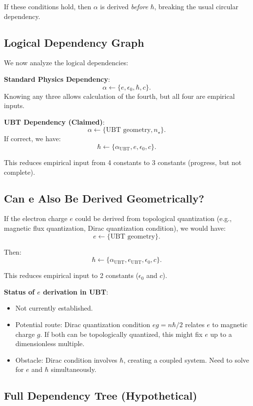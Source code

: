 \documentclass[12pt]{article}
\begin{document}
If these conditions hold, then $\alpha$ is derived \emph{before} $\hbar$, breaking the usual circular dependency.

\subsection{Logical Dependency Graph}

We now analyze the logical dependencies:

\textbf{Standard Physics Dependency}:
\[
\alpha \leftarrow \{e, \epsilon_0, \hbar, c\}.
\]
Knowing any three allows calculation of the fourth, but all four are empirical inputs.

\textbf{UBT Dependency (Claimed)}:
\[
\alpha \leftarrow \{\text{UBT geometry}, n_\star\}.
\]
If correct, we have:
\[
\hbar \leftarrow \{\alpha_{\text{UBT}}, e, \epsilon_0, c\}.
\]

This reduces empirical input from 4 constants to 3 constants (progress, but not complete).

\subsection{Can e Also Be Derived Geometrically?}

If the electron charge $e$ could be derived from topological quantization (e.g., magnetic flux quantization, Dirac quantization condition), we would have:
\[
e \leftarrow \{\text{UBT geometry}\}.
\]

Then:
\[
\hbar \leftarrow \{\alpha_{\text{UBT}}, e_{\text{UBT}}, \epsilon_0, c\}.
\]

This reduces empirical input to 2 constants ($\epsilon_0$ and $c$).

\textbf{Status of $e$ derivation in UBT}:
\begin{itemize}
\item Not currently established.
\item Potential route: Dirac quantization condition $eg = n \hbar / 2$ relates $e$ to magnetic charge $g$. If both can be topologically quantized, this might fix $e$ up to a dimensionless multiple.
\item Obstacle: Dirac condition involves $\hbar$, creating a coupled system. Need to solve for $e$ and $\hbar$ simultaneously.
\end{itemize}

\subsection{Full Dependency Tree (Hypothetical)}
\end{document}
